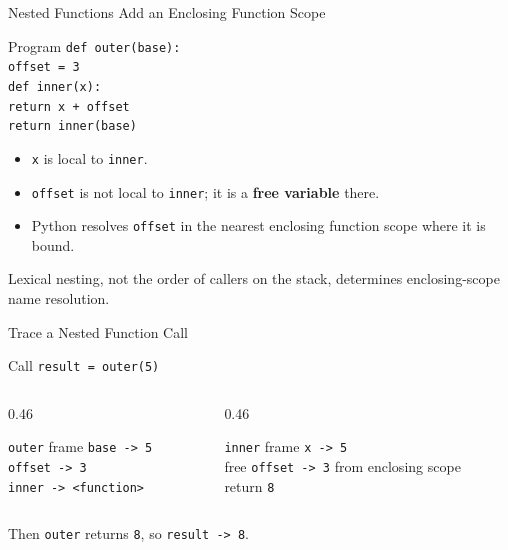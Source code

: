 \documentclass[aspectratio=169,10pt]{beamer}
\begin{document}
\begin{frame}{Nested Functions Add an Enclosing Function Scope}
  \begin{block}{Program}
    \texttt{def outer(base):}\\
    \hspace*{0.20in}\texttt{offset = 3}\\
    \hspace*{0.20in}\texttt{def inner(x):}\\
    \hspace*{0.40in}\texttt{return x + offset}\\
    \hspace*{0.20in}\texttt{return inner(base)}
  \end{block}

  \begin{itemize}
    \item \texttt{x} is local to \texttt{inner}.
    \item \texttt{offset} is not local to \texttt{inner}; it is a \textbf{free variable} there.
    \item Python resolves \texttt{offset} in the nearest enclosing function scope where it is bound.
  \end{itemize}

  \begin{keyidea}
    Lexical nesting, not the order of callers on the stack, determines enclosing-scope name resolution.
  \end{keyidea}
\end{frame}

\begin{frame}{Trace a Nested Function Call}
  \begin{block}{Call}
    \centering
    \Large\texttt{result = outer(5)}
  \end{block}

  \begin{columns}[T,onlytextwidth]
    \begin{column}{0.46\textwidth}
      \begin{block}{\texttt{outer} frame}
        \texttt{base -> 5}\\
        \texttt{offset -> 3}\\
        \texttt{inner -> <function>}
      \end{block}
    \end{column}

    \begin{column}{0.46\textwidth}
      \begin{block}{\texttt{inner} frame}
        \texttt{x -> 5}\\
        free \texttt{offset -> 3} from enclosing scope\\
        return \texttt{8}
      \end{block}
    \end{column}
  \end{columns}

  Then \texttt{outer} returns \texttt{8}, so \texttt{result -> 8}.
\end{frame}
\end{document}
